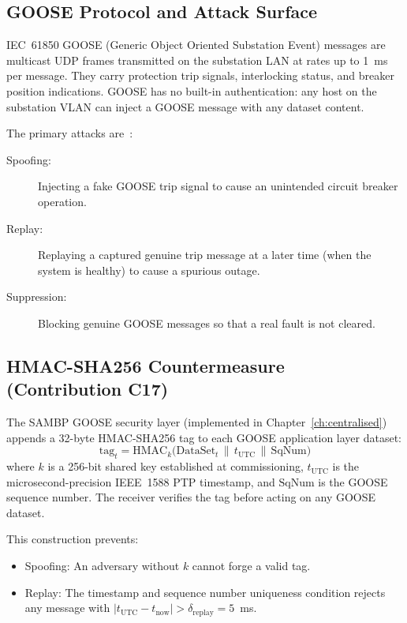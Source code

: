 \subsection{GOOSE Protocol and Attack Surface}

IEC~61850 GOOSE (Generic Object Oriented Substation Event) messages are
multicast UDP frames transmitted on the substation LAN at rates up to
1~ms per message. They carry protection trip signals, interlocking status,
and breaker position indications. GOOSE has no built-in authentication:
any host on the substation VLAN can inject a GOOSE message with any
dataset content.

The primary attacks are~\citep{IEC62351}:
\begin{description}
\item[Spoofing:] Injecting a fake GOOSE trip signal to cause an
    unintended circuit breaker operation.
\item[Replay:] Replaying a captured genuine trip message at a later
    time (when the system is healthy) to cause a spurious outage.
\item[Suppression:] Blocking genuine GOOSE messages so that a real
    fault is not cleared.
\end{description}

\subsection{HMAC-SHA256 Countermeasure (Contribution C17)}

The SAMBP GOOSE security layer (implemented in Chapter~\ref{ch:centralised})
appends a 32-byte HMAC-SHA256 tag to each GOOSE application layer dataset:
\begin{equation}
  \mathrm{tag}_t = \mathrm{HMAC}_k\bigl(\mathrm{DataSet}_t \,\|\, t_\mathrm{UTC} \,\|\, \mathrm{SqNum}\bigr)
  \label{eq:ch12_hmac}
\end{equation}
where $k$ is a 256-bit shared key established at commissioning,
$t_\mathrm{UTC}$ is the microsecond-precision IEEE~1588 PTP timestamp,
and $\mathrm{SqNum}$ is the GOOSE sequence number. The receiver verifies
the tag before acting on any GOOSE dataset.

This construction prevents:
\begin{itemize}
\item Spoofing: An adversary without $k$ cannot forge a valid tag.
\item Replay: The timestamp and sequence number uniqueness condition
      rejects any message with $|t_\mathrm{UTC} - t_\mathrm{now}| > \delta_\mathrm{replay} = 5$~ms.
\end{itemize}

